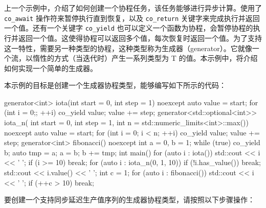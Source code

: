 
上一个示例中，介绍了如何创建一个协程任务，该任务能够进行异步计算。使用了 \verb|co_await| 操作符来暂停执行直到恢复，以及 \verb|co_return| 关键字来完成执行并返回一个值。还有一个关键字 \verb|co_yield| 也可以定义一个函数为协程，会暂停协程的执行并返回一个值。这使得协程可以返回多个值，每次恢复时返回一个值。为了支持这一特性，需要另一种类型的协程，这种类型称为生成器（generator）。它就像一个流，以惰性的方式（当迭代时）产生一系列类型为 T 的值。本示例中，将介绍如何实现一个简单的生成器。


本示例的目标是创建一个生成器协程类型，能够编写如下所示的代码：

\begin{cpp}
generator<int> iota(int start = 0, int step = 1) noexcept
{
    auto value = start;
    for (int i = 0;; ++i)
    {
        co_yield value;
        value += step;
    }
}
generator<std::optional<int>> iota_n(
int start = 0, int step = 1,
int n = std::numeric_limits<int>::max()) noexcept
{
    auto value = start;
    for (int i = 0; i < n; ++i)
    {
        co_yield value;
        value += step;
    }
}
generator<int> fibonacci() noexcept
{
    int a = 0, b = 1;
    while (true)
    {
        co_yield b;
        auto tmp = a;
        a = b;
        b += tmp;
    }
}
int main()
{
    for (auto i : iota())
    {
        std::cout << i << ' ';
        if (i >= 10) break;
    }
    for (auto i : iota_n(0, 1, 10))
    {
        if (!i.has_value()) break;
        std::cout << i.value() << ' ';
    }
    int c = 1;
    for (auto i : fibonacci())
    {
        std::cout << i << ' ';
        if (++c > 10) break;
    }
}
\end{cpp}


要创建一个支持同步延迟生产值序列的生成器协程类型，请按照以下步骤操作：

